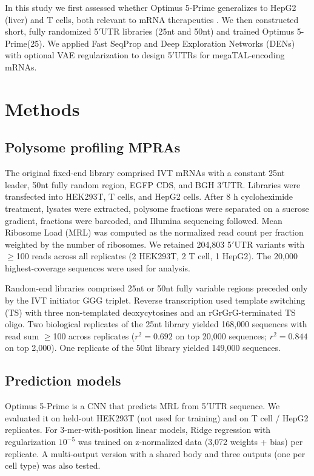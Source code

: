 \documentclass[11pt]{article}
\begin{document}
In this study we first assessed whether Optimus 5-Prime \cite{sample2019human} generalizes to HepG2 (liver) and T cells, both relevant to mRNA therapeutics \cite{trepotec2019delivery,zangi2013modified,yin2014genome,rupp2017car}. We then constructed short, fully randomized 5$'$UTR libraries (25nt and 50nt) and trained Optimus 5-Prime(25). We applied Fast SeqProp \cite{linder2020fastseqprop} and Deep Exploration Networks (DENs) \cite{linder2020generative} with optional VAE \cite{kingma2014autoencoding} regularization to design 5$'$UTRs for megaTAL-encoding mRNAs.

\section{Methods}
\subsection{Polysome profiling MPRAs}
The original fixed-end library comprised IVT mRNAs with a constant 25nt leader, 50nt fully random region, EGFP CDS, and BGH 3$'$UTR. Libraries were transfected into HEK293T, T cells, and HepG2 cells. After 8 h cycloheximide treatment, lysates were extracted, polysome fractions were separated on a sucrose gradient, fractions were barcoded, and Illumina sequencing followed. Mean Ribosome Load (MRL) was computed as the normalized read count per fraction weighted by the number of ribosomes. We retained 204{,}803 5$'$UTR variants with $\geq$100 reads across all replicates (2 HEK293T, 2 T cell, 1 HepG2). The 20{,}000 highest-coverage sequences were used for analysis.

Random-end libraries comprised 25nt or 50nt fully variable regions preceded only by the IVT initiator GGG triplet. Reverse transcription used template switching (TS) with three non-templated deoxycytosines and an rGrGrG-terminated TS oligo. Two biological replicates of the 25nt library yielded 168{,}000 sequences with read sum $\geq$100 across replicates ($r^2 = 0.692$ on top 20{,}000 sequences; $r^2 = 0.844$ on top 2{,}000). One replicate of the 50nt library yielded 149{,}000 sequences.

\subsection{Prediction models}
Optimus 5-Prime \cite{sample2019human} is a CNN that predicts MRL from 5$'$UTR sequence. We evaluated it on held-out HEK293T (not used for training) and on T cell / HepG2 replicates. For 3-mer-with-position linear models, Ridge regression with regularization $10^{-5}$ was trained on z-normalized data (3{,}072 weights + bias) per replicate. A multi-output version with a shared body and three outputs (one per cell type) was also tested.
\end{document}
